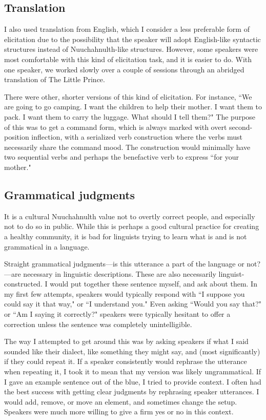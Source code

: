 \subsection{Translation}

I also used translation from English, which I consider a less preferable form of elicitation due to the possibility that the speaker will adopt English-like syntactic structures instead of Nuuchahnulth-like structures. However, some speakers were most comfortable with this kind of elicitation task, and it is easier to do. With one speaker, we worked slowly over a couple of sessions through an abridged translation of The Little Prince.

There were other, shorter versions of this kind of elicitation. For instance, ``We are going to go camping. I want the children to help their mother. I want them to pack. I want them to carry the luggage. What should I tell them?" The purpose of this was to get a command form, which is always marked with overt second-position inflection, with a serialized verb construction where the verbs must necessarily share the command mood. The construction would minimally have two sequential verbs and perhaps the benefactive verb to express ``for your mother."

\subsection{Grammatical judgments}

It is a cultural Nuuchahnulth value not to overtly correct people, and especially not to do so in public. While this is perhaps a good cultural practice for creating a healthy community, it is bad for linguists trying to learn what is and is not grammatical in a language.

Straight grammatical judgments---is this utterance a part of the language or not?---are necessary in linguistic descriptions. These are also necessarily linguist-constructed. I would put together these sentence myself, and ask about them. In my first few attempts, speakers would typically respond with ``I suppose you could say it that way," or ``I understand you." Even asking ``Would you say that?" or ``Am I saying it correctly?" speakers were typically hesitant to offer a correction unless the sentence was completely unintelligible.

The way I attempted to get around this was by asking speakers if what I said sounded like their dialect, like something they might say, and (most significantly) if they could repeat it. If a speaker consistently would rephrase the utterance when repeating it, I took it to mean that my version was likely ungrammatical. If I gave an example sentence out of the blue, I tried to provide context. I often had the best success with getting clear judgments by rephrasing speaker utterances. I would add, remove, or move an element, and sometimes change the setup. Speakers were much more willing to give a firm yes or no in this context.

